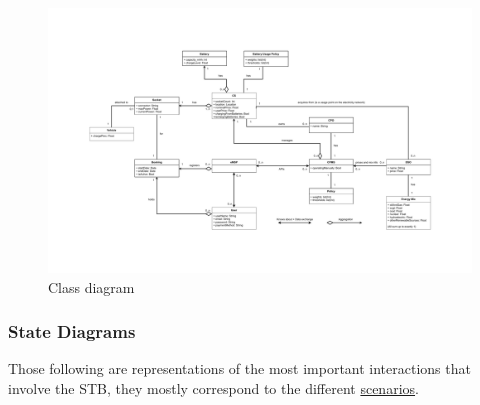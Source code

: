 \documentclass[11pt]{article}
\begin{document}
\newpage

\begin{figure}[!ht]
    \centerline{
        \includegraphics[page={1}, width=1.26\linewidth, trim=4.6cm 4.9cm 4.6cm 4.9cm, angle=-90, clip]{UML.pdf}
    }
    \caption{Class diagram}
\end{figure}

\newpage

\subsubsection{State Diagrams}

Those following are representations of the most important interactions that involve the STB, they mostly correspond to the different \hyperref[subsubsec:scenarios]{scenarios}.
\end{document}
